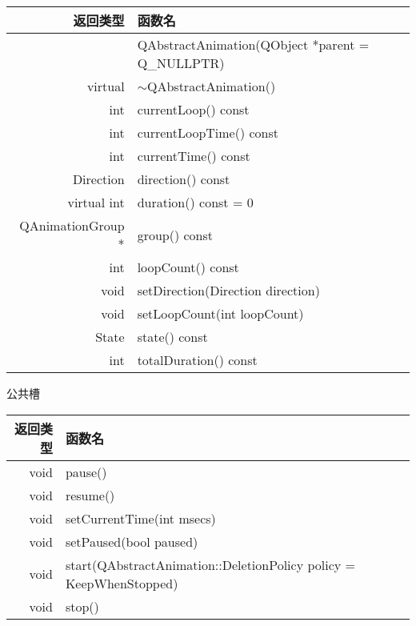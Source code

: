 \begin{tabular}{|r|l|}

\hline
返回类型 &	函数名\\
\hline
& QAbstractAnimation(QObject *parent = Q\_NULLPTR)\\
\hline
virtual&$\sim$QAbstractAnimation()\\
\hline
int	& currentLoop() const\\
\hline
int	& currentLoopTime() const\\
\hline
int	& currentTime() const\\
\hline
Direction& direction() const\\
\hline
virtual int	&duration() const = 0\\
\hline
QAnimationGroup *&	group() const\\
\hline
int	&loopCount() const\\
\hline
void&	setDirection(Direction direction)\\
\hline
void&	setLoopCount(int loopCount)\\
\hline
State&	state() const\\
\hline
int	& totalDuration() const\\
\hline
\end{tabular}

公共槽

\begin{tabular}{|r|l|}
\hline
返回类型&	函数名 \\
\hline
void&	pause()\\
\hline
void&	resume()\\
\hline
void&	setCurrentTime(int msecs)\\
\hline
void&	setPaused(bool paused)\\
\hline
void&	start(QAbstractAnimation::DeletionPolicy policy = KeepWhenStopped)\\
\hline
void&	stop() \\
\hline
\end{tabular}

